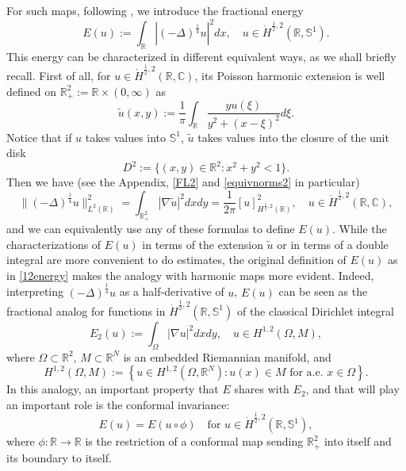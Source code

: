\documentclass[12pt, a4paper]{article}
\newcommand{\sph}{\mathbb{S}}
\newcommand{\R}{\mathbb{R}}
\renewcommand{\(}{\left(}
\renewcommand{\)}{\right)}
\begin{document}
For such maps, following \cite{DLR}, we introduce the fractional energy
\begin{equation}\label{12energy}
E(u):=\int_{\R}\left|(-\Delta)^\frac14u\right|^2dx, \quad u\in \dot H^{\frac12,2}(\R, \sph^1).
\end{equation}
This energy can be characterized in different equivalent ways, as we shall briefly recall. First of all, for $ u\in \dot H^{\frac12,2}(\R, \mathbb{C})$, its Poisson harmonic extension is well defined on $\R^2_+:=\R\times(0,\infty)$ as
$$\tilde u(x,y):=\frac{1}{\pi}\int_{\R}\frac{yu(\xi)}{y^2+(x-\xi)^2}d\xi.$$
Notice that if $u$ takes values into $\sph^1$, $\tilde u$ takes values into the closure of the unit disk
$$D^2:=\{(x,y)\in \R^2:x^2+y^2<1\}.$$
Then we have (see the Appendix, \eqref{FL2} and \eqref{equivnorms2} in particular) %
\begin{equation}\label{equiv1}
\|(-\Delta)^\frac14 u\|_{L^2(\R)}^2= \int_{\R^2_+}|\nabla \tilde u|^2 dxdy =\frac{1}{2\pi}[u]_{H^{\frac{1}{2},2}(\R)}^2,\quad u\in \dot H^{\frac12,2}(\R, \mathbb{C}),
\end{equation}
and we can equivalently use any of these formulas to define $E(u)$. %
While the characterizations of $E(u)$ in terms of the extension $\tilde u$ or in terms of a double integral are more convenient to do estimates, the original definition of $E(u)$ as in \eqref{12energy} makes the analogy with harmonic maps more evident. Indeed, interpreting $(-\Delta)^\frac14 u$ as a half-derivative of $u$, $E(u)$ can be seen as the fractional analog for functions in $\dot H^{\frac{1}{2},2}(\R,\sph^1)$ of the classical Dirichlet integral
$$E_2(u):=\int_{\Omega}|\nabla u|^2 dxdy,\quad u\in H^{1,2}(\Omega,M),$$
where $\Omega\subset\R^2$, $M\subset\R^N$ is an embedded Riemannian manifold, and
$$H^{1,2}(\Omega,M):=\left\{u\in H^{1,2}(\Omega,\R^N): u(x)\in M \text{ for a.e. }x\in \Omega\right\}.$$
In this analogy,
an important property that $E$ shares with $E_2$, and that will play an important role is the conformal invariance:  
$$E(u)=E(u\circ \phi)\quad \text{for } u\in \dot H^{\frac12,2}(\R, \sph^1),$$
where $\phi:\R\to\R$ is the restriction of a conformal map sending $\R^2_+$ into itself and its boundary to itself.
\end{document}
